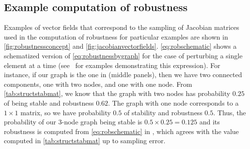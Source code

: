 \subsection{Example computation of robustness}
Examples of vector fields that correspond to the sampling of Jacobian matrices used in the computation of robustness for particular examples are shown in \ref{fig:robustnessconcept} and \ref{fig:jacobianvectorfields}. \ref{eq:robschematic} shows a schematized version of \ref{eq:robustnessbygraph} for the case of perturbing a single element at a time  (see $\,$ for examples demonstrating this expression). For instance, if our graph is the one in  (middle panels), then we have two connected components, one with two nodes, and one with one node.  From \ref{tab:structstabmat}, we know that the graph with two nodes has probability $0.25$ of being stable and robustness $0.62$.  The graph with one node corresponds to a $1 \times 1$ matrix, so we have probability $0.5$ of stability and robustness $0.5$.  Thus, the probability of our 3-node graph being stable is $0.5 \times 0.25 = 0.125$ and its robustness is computed from \ref{eq:robschematic} in , which agrees with the value computed in \ref{tab:structstabmat} up to sampling error.

